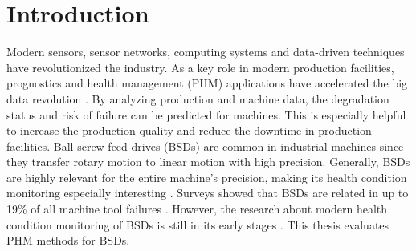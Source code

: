 
\chapter{Introduction}
Modern sensors, sensor networks, computing systems and data-driven techniques have revolutionized the industry. As a key role in modern production facilities, prognostics and health management (PHM) applications have accelerated the big data revolution \cite{ZHAO2019213}. By analyzing production and machine data, the degradation status and risk of failure can be predicted for machines. This is especially helpful to increase the production quality and reduce the downtime in production facilities. Ball screw feed drives (BSDs) are common in industrial machines since they transfer rotary motion to linear motion with high precision. Generally, BSDs are highly relevant for the entire machine’s precision, making its health condition monitoring especially interesting \cite{LiPin2018}. Surveys showed that BSDs are related in up to 19\% of all machine tool failures \cite{Denkena2021}. However, the research about modern health condition monitoring of BSDs is still in its early stages \cite{LiPin2018}. This thesis evaluates PHM methods for BSDs.


